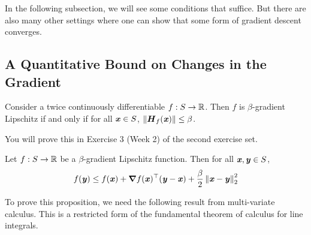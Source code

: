 In the following subsection, we will see some conditions that
suffice.
But there are also many other settings where one can show that some
form of gradient descent converges.

\subsection{A Quantitative Bound on Changes in the Gradient}

\begin{proposition}
\label{prp:hessiangradlip}
  Consider a twice continuously differentiable $f: S \to \mathbb{R}$.
  Then $f$ is $\beta$-gradient Lipschitz if and only if for all $\boldsymbol{\mathit{x}} \in
 S$,
  $\left\| \boldsymbol{{H}}_f(\boldsymbol{\mathit{x}}) \right\| \leq \beta$.
\end{proposition}
 You will prove this in Exercise 3 (Week 2) of the second exercise set.

\begin{proposition}
  \label{prp:lipgradub}
  Let $f: S \to \mathbb{R}$ be a $\beta$-gradient Lipschitz function.
  Then for all $\boldsymbol{\mathit{x}}, \boldsymbol{\mathit{y}} \in S$,
  \[
    f(\boldsymbol{\mathit{y}}) \leq f(\boldsymbol{\mathit{x}}) + \boldsymbol{\nabla} f(\boldsymbol{\mathit{x}})^\top (\boldsymbol{\mathit{y}}-\boldsymbol{\mathit{x}}) + \frac{\beta}{2}
    \left\| \boldsymbol{\mathit{x}}-\boldsymbol{\mathit{y}} \right\|_2^2
    \]
\end{proposition}

To prove this proposition, we need the following result from
multi-variate calculus. This is a restricted form of the fundamental
theorem of calculus for line integrals.

